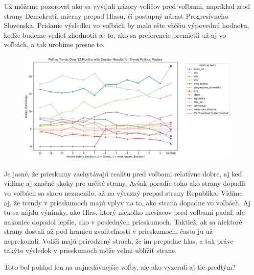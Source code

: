 \documentclass[main.tex]{subfiles}
\begin{document}
Už môžeme pozorovať ako sa vyvíjali názory voličov pred voľbami, napríklad zrod strany Demokrati, mierny prepad Hlasu, či postupný nárast Progresívneho Slovenska. Pridanie výsledku vo voľbách by malo ešte väčšiu výpovednú hodnotu, keďže budeme vedieť zhodnotiť aj to, ako sa preferencie premietli už aj vo voľbách, a tak urobíme presne to.
\begin{figure}[H]
    \centering
    \includegraphics[width=\textwidth]{images_exploratory/Polls_with_result_2023.png}
    \caption{}
\end{figure}

Je jasné, že prieskumy zachytávajú realitu pred voľbami relatívne dobre, aj keď vidíme aj značné skoky pre určité strany. Avšak poradie toho ako strany dopadli vo voľbách sa skoro nezmenilo, až na výrazný prepad strany Republika.
Vidíme aj, že trendy v prieskumoch majú vplyv na to, ako strana dopadne vo voľbách. Aj tu sa nájdu výnimky, ako Hlas, ktorý niekoľko mesiacov pred voľbami padal, ale nakoniec dopadol lepšie, ako v posledných prieskumoch. Taktiež, ak sa niektoré strany dostali až pod hranicu zvoliteľnosti v prieskumoch, často ju už neprekonali. Voliči majú prirodzený strach, že im prepadne hlas, a tak práve takýto výsledok v prieskumoch môže veľmi ublížiť strane.

Toto bol pohľad len na najnedávnejšie voľby, ale ako vyzerali aj tie predtým?
\end{document}
